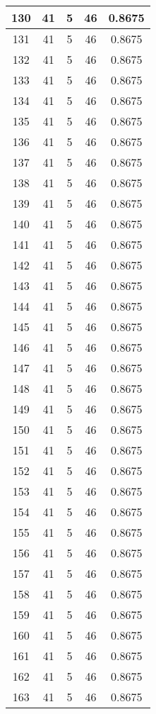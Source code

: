 \documentclass[letterpaper, 12pt]{article}
\begin{document}
\begin{longtable}{|c|c|c|c|c|}
\hline
130 & 41 & 5 & 46 & 0.8675 \\
\hline
131 & 41 & 5 & 46 & 0.8675 \\
\hline
132 & 41 & 5 & 46 & 0.8675 \\
\hline
133 & 41 & 5 & 46 & 0.8675 \\
\hline
134 & 41 & 5 & 46 & 0.8675 \\
\hline
135 & 41 & 5 & 46 & 0.8675 \\
\hline
136 & 41 & 5 & 46 & 0.8675 \\
\hline
137 & 41 & 5 & 46 & 0.8675 \\
\hline
138 & 41 & 5 & 46 & 0.8675 \\
\hline
139 & 41 & 5 & 46 & 0.8675 \\
\hline
140 & 41 & 5 & 46 & 0.8675 \\
\hline
141 & 41 & 5 & 46 & 0.8675 \\
\hline
142 & 41 & 5 & 46 & 0.8675 \\
\hline
143 & 41 & 5 & 46 & 0.8675 \\
\hline
144 & 41 & 5 & 46 & 0.8675 \\
\hline
145 & 41 & 5 & 46 & 0.8675 \\
\hline
146 & 41 & 5 & 46 & 0.8675 \\
\hline
147 & 41 & 5 & 46 & 0.8675 \\
\hline
148 & 41 & 5 & 46 & 0.8675 \\
\hline
149 & 41 & 5 & 46 & 0.8675 \\
\hline
150 & 41 & 5 & 46 & 0.8675 \\
\hline
151 & 41 & 5 & 46 & 0.8675 \\
\hline
152 & 41 & 5 & 46 & 0.8675 \\
\hline
153 & 41 & 5 & 46 & 0.8675 \\
\hline
154 & 41 & 5 & 46 & 0.8675 \\
\hline
155 & 41 & 5 & 46 & 0.8675 \\
\hline
156 & 41 & 5 & 46 & 0.8675 \\
\hline
157 & 41 & 5 & 46 & 0.8675 \\
\hline
158 & 41 & 5 & 46 & 0.8675 \\
\hline
159 & 41 & 5 & 46 & 0.8675 \\
\hline
160 & 41 & 5 & 46 & 0.8675 \\
\hline
161 & 41 & 5 & 46 & 0.8675 \\
\hline
162 & 41 & 5 & 46 & 0.8675 \\
\hline
163 & 41 & 5 & 46 & 0.8675 \\

\end{longtable}
\end{document}

